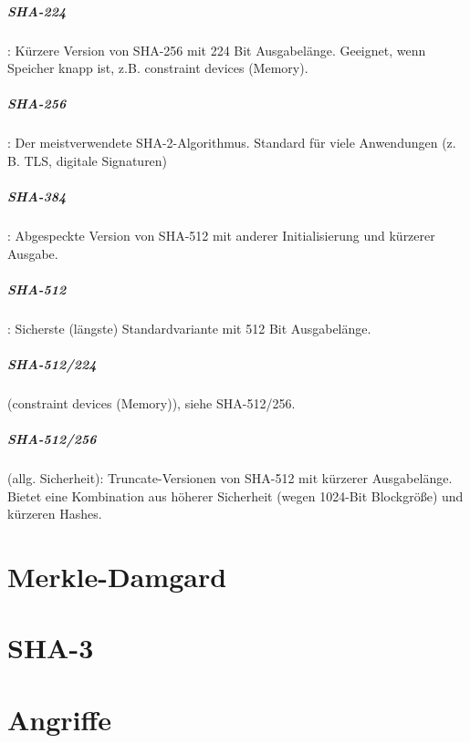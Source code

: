 \subparagraph{SHA-224}: Kürzere Version von SHA-256 mit 224 Bit Ausgabelänge. Geeignet, wenn Speicher knapp ist, z.B. constraint devices (Memory).
\subparagraph{SHA-256}: Der meistverwendete SHA-2-Algorithmus. Standard für viele Anwendungen (z. B. TLS, digitale Signaturen)
\subparagraph{SHA-384}: Abgespeckte Version von SHA-512 mit anderer Initialisierung und kürzerer Ausgabe.
\subparagraph{SHA-512}: Sicherste (längste) Standardvariante mit 512 Bit Ausgabelänge.
\subparagraph{SHA-512/224} (constraint devices (Memory)), siehe SHA-512/256.  
\subparagraph{SHA-512/256} (allg. Sicherheit): Truncate-Versionen von SHA-512 mit kürzerer Ausgabelänge. Bietet eine Kombination aus höherer
Sicherheit (wegen 1024-Bit Blockgröße) und kürzeren Hashes.

\section{Merkle-Damgard}
\section{SHA-3}
\section{Angriffe}




